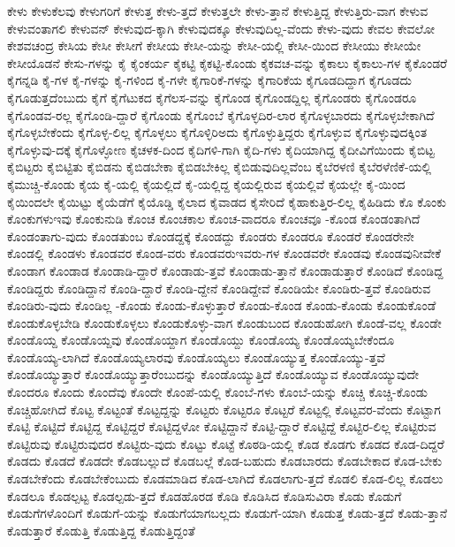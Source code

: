 {ಕೇಳು
ಕೇಳುಕೆಲವು
ಕೇಳುಗರಿಗೆ
ಕೇಳುತ್ತ
ಕೇಳು-ತ್ತದೆ
ಕೇಳುತ್ತಲೇ
ಕೇಳು-ತ್ತಾನೆ
ಕೇಳುತ್ತಿದ್ದ
ಕೇಳುತ್ತಿರು-ವಾಗ
ಕೇಳುವ
ಕೇಳುವಂತಾಗಲಿ
ಕೇಳುವನ್
ಕೇಳುವುದ-ಕ್ಕಾಗಿ
ಕೇಳುವುದಕ್ಕೂ
ಕೇಳುವುದಿಲ್ಲ-ವೆಂದು
ಕೇಳು-ವುದು
ಕೇವಲ
ಕೇವಲೋ
ಕೇಶವಚಂದ್ರ
ಕೇಸಿಯ
ಕೇಸೀ
ಕೇಸೀಗೆ
ಕೇಸೀಯ
ಕೇಸೀ-ಯನ್ನು
ಕೇಸೀ-ಯಲ್ಲಿ
ಕೇಸೀ-ಯಿಂದ
ಕೇಸೀಯು
ಕೇಸೀಯೇ
ಕೇಸೀಯೊಡನೆ
ಕೇಸು-ಗಳನ್ನು
ಕೈ
ಕೈಂಕರ್ಯ
ಕೈಕಟ್ಟಿ
ಕೈಕಟ್ಟಿ-ಕೊಂಡು
ಕೈಕವಚ-ವನ್ನು
ಕೈಕಾಲು
ಕೈಕಾಲು-ಗಳ
ಕೈಕೊಂಡರೆ
ಕೈಗನ್ನಡಿ
ಕೈ-ಗಳ
ಕೈ-ಗಳನ್ನು
ಕೈ-ಗಳಿಂದ
ಕೈ-ಗಳೇ
ಕೈಗಾರಿಕೆ-ಗಳನ್ನು
ಕೈಗಾರಿಕೆಯ
ಕೈಗೂಡದಿದ್ದಾಗ
ಕೈಗೂಡದು
ಕೈಗೂಡುತ್ತದೆಂಬುದು
ಕೈಗೆ
ಕೈಗೆಟುಕದ
ಕೈಗೆಲಸ-ವನ್ನು
ಕೈಗೊಂಡ
ಕೈಗೊಂಡದ್ದಿಲ್ಲ
ಕೈಗೊಂಡರು
ಕೈಗೊಂಡರೂ
ಕೈಗೊಂಡವ-ರಲ್ಲ
ಕೈಗೊಂಡಿ-ದ್ದಾರೆ
ಕೈಗೊಂಡು
ಕೈಗೊಂಬೆ
ಕೈಗೊಳ್ಳದಿರ-ಲಾರ
ಕೈಗೊಳ್ಳಬಾರದು
ಕೈಗೊಳ್ಳಬೇಕಾಗಿದೆ
ಕೈಗೊಳ್ಳಬೇಕೆಂದು
ಕೈಗೊಳ್ಳ-ಲಿಲ್ಲ
ಕೈಗೊಳ್ಳಲು
ಕೈಗೊಳ್ಳಿರಿಅದು
ಕೈಗೊಳ್ಳುತ್ತಿದ್ದರು
ಕೈಗೊಳ್ಳುವ
ಕೈಗೊಳ್ಳುವುದಕ್ಕಿಂತ
ಕೈಗೊಳ್ಳುವು-ದಕ್ಕೆ
ಕೈಗೊಳ್ಳೋಣ
ಕೈಚಳಕ-ದಿಂದ
ಕೈದಿಗಳಿ-ಗಾಗಿ
ಕೈದಿ-ಗಳು
ಕೈದಿಯಾಗಿದ್ದ
ಕೈದೀವಿಗೆಯಿಂದು
ಕೈಬಿಟ್ಟ
ಕೈಬಿಟ್ಟರು
ಕೈಬಿಟ್ಟಿತು
ಕೈಬಿಡನು
ಕೈಬಿಡಬೇಕಾ
ಕೈಬಿಡಬೇಕಿಲ್ಲ
ಕೈಬಿಡುವುದಿಲ್ಲವೆಂಬ
ಕೈಬೆರಳಣಿ
ಕೈಬೆರಳೆಣಿಕೆ-ಯಲ್ಲಿ
ಕೈಮುಚ್ಚಿ-ಕೊಂಡು
ಕೈಯ
ಕೈ-ಯಲ್ಲಿ
ಕೈಯಲ್ಲಿದೆ
ಕೈ-ಯಲ್ಲಿದ್ದ
ಕೈಯಲ್ಲಿರುವ
ಕೈಯಲ್ಲಿವೆ
ಕೈಯಲ್ಲೇ
ಕೈ-ಯಿಂದ
ಕೈಯಿಂದಲೇ
ಕೈಯಿಟ್ಟು
ಕೈಯೆಡೆಗೆ
ಕೈಯೊಡ್ಡಿ
ಕೈಲಾದ
ಕೈವಾಡದ
ಕೈಸೇರಿದೆ
ಕೈಹಾಕುತ್ತಿರ-ಲಿಲ್ಲ
ಕೈಹಿಡಿದು
ಕೊ
ಕೊಂಕು
ಕೊಂಕುಗಳುಇವು
ಕೊಂಕುನುಡಿ
ಕೊಂಚ
ಕೊಂಚಕಾಲ
ಕೊಂಚ-ವಾದರೂ
ಕೊಂಚವೂ
-ಕೊಂಡ
ಕೊಂಡಂತಾಗಿದೆ
ಕೊಂಡಂತಾಗು-ವುದು
ಕೊಂಡತುಂಬ
ಕೊಂಡದ್ದಕ್ಕೆ
ಕೊಂಡದ್ದು
ಕೊಂಡರು
ಕೊಂಡರೂ
ಕೊಂಡರೆ
ಕೊಂಡರೇನೇ
ಕೊಂಡಲ್ಲಿ
ಕೊಂಡಳು
ಕೊಂಡವರ
ಕೊಂಡ-ವರು
ಕೊಂಡವರುಇವರು-ಗಳ
ಕೊಂಡವರೇ
ಕೊಂಡವು
ಕೊಂಡವುನೀವೇಕೆ
ಕೊಂಡಾಗ
ಕೊಂಡಾಡ
ಕೊಂಡಾಡಿ-ದ್ದಾರೆ
ಕೊಂಡಾಡು-ತ್ತವೆ
ಕೊಂಡಾಡು-ತ್ತಾನೆ
ಕೊಂಡಾಡುತ್ತಾರೆ
ಕೊಂಡಿದೆ
ಕೊಂಡಿದ್ದ
ಕೊಂಡಿದ್ದರು
ಕೊಂಡಿದ್ದಾನೆ
ಕೊಂಡಿ-ದ್ದಾರೆ
ಕೊಂಡಿ-ದ್ದೇನೆ
ಕೊಂಡಿದ್ದೇವೆ
ಕೊಂಡಿಯೇ
ಕೊಂಡಿರು-ತ್ತವೆ
ಕೊಂಡಿರುವ
ಕೊಂಡಿರು-ವುದು
ಕೊಂಡಿಲ್ಲ
-ಕೊಂಡು
ಕೊಂಡು-ಕೊಳ್ಳುತ್ತಾರೆ
ಕೊಂಡು-ಕೊಂಡ
ಕೊಂಡು-ಕೊಂಡು
ಕೊಂಡುಕೊಂಡೆ
ಕೊಂಡುಕೊಳ್ಳಬೇಡಿ
ಕೊಂಡುಕೊಳ್ಳಲು
ಕೊಂಡುಕೊಳ್ಳು-ವಾಗ
ಕೊಂಡುಬಂದ
ಕೊಂಡುಹೋಗಿ
ಕೊಂಡೆ-ವಲ್ಲ
ಕೊಂಡೇ
ಕೊಂಡೊಯ್ದ
ಕೊಂಡೊಯ್ದವು
ಕೊಂಡೊಯ್ದಾಗ
ಕೊಂಡೊಯ್ದು
ಕೊಂಡೊಯ್ಯ
ಕೊಂಡೊಯ್ಯಬೇಕೆಂದೂ
ಕೊಂಡೊಯ್ಯ-ಲಾಗಿದೆ
ಕೊಂಡೊಯ್ಯಲಾರವು
ಕೊಂಡೊಯ್ಯಲು
ಕೊಂಡೊಯ್ಯುತ್ತ
ಕೊಂಡೊಯ್ಯು-ತ್ತವೆ
ಕೊಂಡೊಯ್ಯುತ್ತಾರೆ
ಕೊಂಡೊಯ್ಯುತ್ತಾರೆಂಬುದನ್ನು
ಕೊಂಡೊಯ್ಯುತ್ತಿದೆ
ಕೊಂಡೊಯ್ಯುವ
ಕೊಂಡೊಯ್ಯುವುದೇ
ಕೊಂದರೂ
ಕೊಂದು
ಕೊಂದೆವು
ಕೊಂದೇ
ಕೊಂಪೆ-ಯಲ್ಲಿ
ಕೊಂಬೆ-ಗಳು
ಕೊಂಬೆ-ಯನ್ನು
ಕೊಚ್ಚಿ
ಕೊಚ್ಚಿ-ಕೊಂಡು
ಕೊಚ್ಚಿಹೋಗಿದೆ
ಕೊಟ್ಟ
ಕೊಟ್ಟಂತೆ
ಕೊಟ್ಟದ್ದನ್ನು
ಕೊಟ್ಟರು
ಕೊಟ್ಟರೂ
ಕೊಟ್ಟರೆ
ಕೊಟ್ಟಲ್ಲಿ
ಕೊಟ್ಟವರ-ವೆಂದು
ಕೊಟ್ಟಾಗ
ಕೊಟ್ಟಿ
ಕೊಟ್ಟಿದೆ
ಕೊಟ್ಟಿದ್ದ
ಕೊಟ್ಟಿದ್ದರೆ
ಕೊಟ್ಟಿದ್ದಳೋ
ಕೊಟ್ಟಿದ್ದಾನೆ
ಕೊಟ್ಟಿ-ದ್ದಾರೆ
ಕೊಟ್ಟಿದ್ದೆ
ಕೊಟ್ಟಿರ-ಲಿಲ್ಲ
ಕೊಟ್ಟಿರುವ
ಕೊಟ್ಟಿರುವು
ಕೊಟ್ಟಿರುವುದರ
ಕೊಟ್ಟಿರು-ವುದು
ಕೊಟ್ಟು
ಕೊಟ್ಟೆ
ಕೊಠಡಿ-ಯಲ್ಲಿ
ಕೊಡ
ಕೊಡಗು
ಕೊಡದ
ಕೊಡ-ದಿದ್ದರೆ
ಕೊಡದು
ಕೊಡದೆ
ಕೊಡದೇ
ಕೊಡಬಲ್ಲುದೆ
ಕೊಡಬಲ್ಲೆ
ಕೊಡ-ಬಹುದು
ಕೊಡಬಾರದು
ಕೊಡಬೇಕಾದ
ಕೊಡ-ಬೇಕು
ಕೊಡಬೇಕೆಂದು
ಕೊಡಬೇಕೆಂಬುದು
ಕೊಡಮಾಡಿದ
ಕೊಡ-ಲಾಗಿದೆ
ಕೊಡಲಾಗು-ತ್ತದೆ
ಕೊಡಲಿ
ಕೊಡ-ಲಿಲ್ಲ
ಕೊಡಲು
ಕೊಡಲೂ
ಕೊಡಲ್ಪಟ್ಟ
ಕೊಡಲ್ಪಡು-ತ್ತದೆ
ಕೊಡಹೊರಡ
ಕೊಡಿ
ಕೊಡಿಸಿದ
ಕೊಡಿಸುವಿರಾ
ಕೊಡು
ಕೊಡುಗೆ
ಕೊಡುಗೆಗಳೊಂದಿಗೆ
ಕೊಡುಗೆ-ಯನ್ನು
ಕೊಡುಗೆಯಾಗಬಲ್ಲದು
ಕೊಡುಗೆ-ಯಾಗಿ
ಕೊಡುತ್ತ
ಕೊಡು-ತ್ತದೆ
ಕೊಡು-ತ್ತಾನೆ
ಕೊಡುತ್ತಾರೆ
ಕೊಡುತ್ತಿ
ಕೊಡುತ್ತಿದ್ದ
ಕೊಡುತ್ತಿದ್ದಂತೆ
}
